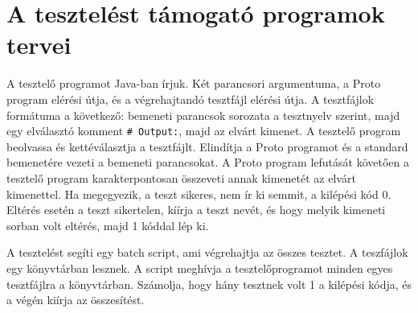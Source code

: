 
\section{A tesztelést támogató programok tervei}
A tesztelő programot Java-ban írjuk. Két parancsori argumentuma, a Proto program elérési útja, és a végrehajtandó tesztfájl elérési útja. A tesztfájlok formátuma a következő: bemeneti parancsok sorozata a tesztnyelv szerint, majd egy elválasztó komment \texttt{\# Output:}, majd az elvárt kimenet. A tesztelő program beolvassa és kettéválasztja a tesztfájlt. Elindítja a Proto programot és a standard bemenetére vezeti a bemeneti parancsokat. A Proto program lefutását követően a tesztelő program karakterpontosan összeveti annak kimenetét az elvárt kimenettel. Ha megegyezik, a teszt sikeres, nem ír ki semmit, a kilépési kód 0. Eltérés esetén a teszt sikertelen, kíírja a teszt nevét, és hogy melyik kimeneti sorban volt eltérés, majd 1 kóddal lép ki.

A tesztelést segíti egy batch script, ami végrehajtja az összes tesztet. A teszfájlok egy könyvtárban lesznek. A script meghívja a tesztelőprogramot minden egyes tesztfájlra a könyvtárban. Számolja, hogy hány tesztnek volt 1 a kilépési kódja, és a végén kiírja az összesítést.

